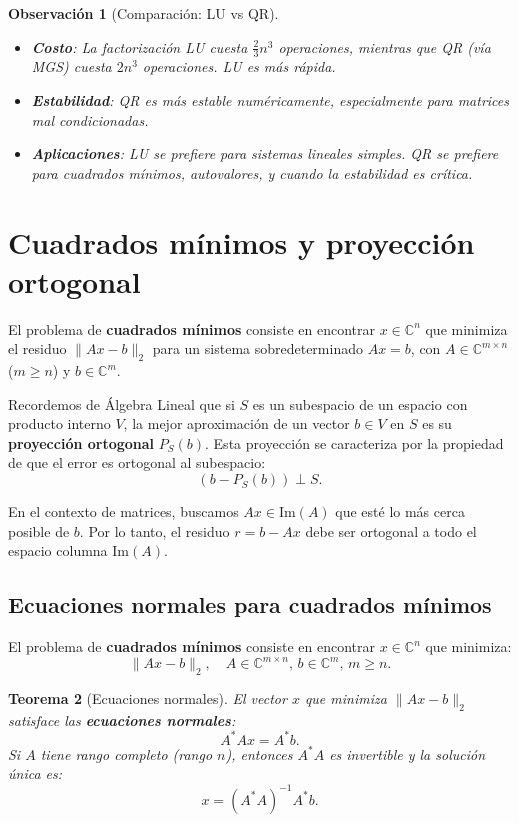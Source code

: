 \documentclass[a4paper,11pt]{report}
\newtheorem{theorem}{Teorema}[chapter]
\newtheorem{remark}[theorem]{Observación}
\begin{document}
\begin{remark}[Comparación: LU vs QR]
\begin{itemize}
\item \textbf{Costo}: La factorización LU cuesta $\frac{2}{3}n^3$ operaciones, mientras que QR (vía MGS) cuesta $2n^3$ operaciones. LU es más rápida.
\item \textbf{Estabilidad}: QR es más estable numéricamente, especialmente para matrices mal condicionadas.
\item \textbf{Aplicaciones}: LU se prefiere para sistemas lineales simples. QR se prefiere para cuadrados mínimos, autovalores, y cuando la estabilidad es crítica.
\end{itemize}
\end{remark}


\section{Cuadrados mínimos y proyección ortogonal}

El problema de \textbf{cuadrados mínimos} consiste en encontrar $x \in \mathbb{C}^n$ que minimiza el residuo $\|Ax - b\|_2$ para un sistema sobredeterminado $Ax=b$, con $A\in\mathbb{C}^{m \times n}$ ($m \geq n$) y $b \in \mathbb{C}^m$.

Recordemos de Álgebra Lineal que si $S$ es un subespacio de un espacio con producto interno $V$, la mejor aproximación de un vector $b \in V$ en $S$ es su \textbf{proyección ortogonal} $P_S(b)$. Esta proyección se caracteriza por la propiedad de que el error es ortogonal al subespacio:
\[
(b - P_S(b)) \perp S.
\]

En el contexto de matrices, buscamos $Ax \in \text{Im}(A)$ que esté lo más cerca posible de $b$. Por lo tanto, el residuo $r = b - Ax$ debe ser ortogonal a todo el espacio columna $\text{Im}(A)$.

\subsection{Ecuaciones normales para cuadrados mínimos}
El problema de \textbf{cuadrados mínimos} consiste en encontrar $x \in \mathbb{C}^n$ que minimiza:
\[
\|Ax - b\|_2, \quad A \in \mathbb{C}^{m \times n}, \, b \in \mathbb{C}^m, \, m \geq n.
\]

\begin{theorem}[Ecuaciones normales]
El vector $x$ que minimiza $\|Ax - b\|_2$ satisface las \textbf{ecuaciones normales}:
\[
A^*Ax = A^*b.
\]
Si $A$ tiene rango completo (rango $n$), entonces $A^*A$ es invertible y la solución única es:
\[
x = (A^*A)^{-1}A^*b.
\]
\end{theorem}
\end{document}
